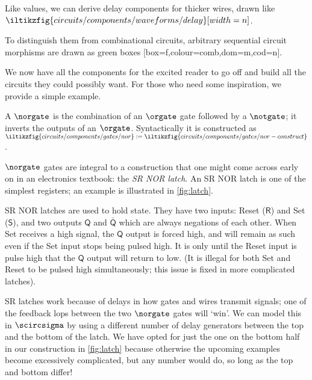 \begin{notation}
    Like values, we can derive delay components for thicker wires, drawn like
    \(
        \iltikzfig{circuits/components/waveforms/delay}[width=n]
    \).
\end{notation}

To distinguish them from combinational circuits, arbitrary sequential circuit
morphisms are drawn as green boxes [box=f,colour=comb,dom=m,cod=n].

We now have all the components for the excited reader to go off and build
all the circuits they could possibly want.
For those who need some inspiration, we provide a simple example.

\begin{example}[SR latch]\label{ex:sr-latch}
    A \(\norgate\) is the combination of an \(\orgate\) gate followed by a
    \(\notgate\); it inverts the outputs of an \(\orgate\).
    Syntactically it is constructed as \(
        \iltikzfig{circuits/components/gates/nor}
        :=
        \iltikzfig{circuits/components/gates/nor-construct}
    \).

    \(\norgate\) gates are integral to a construction that one might come across
    early on in an electronics textbook: the \emph{SR NOR latch}.
    An SR NOR latch is one of the simplest registers; an example is illustrated
    in \cref{fig:latch}.

    SR NOR latches are used to hold state.
    They have two inputs: Reset (\(\mathsf{R}\)) and Set (\(\mathsf{S}\)), and
    two outputs \(\mathsf{Q}\) and \(\bar{\mathsf{Q}}\) which are always
    negations of each other.
    When Set receives a high signal, the \(\mathsf{Q}\) output is forced high,
    and will remain as such even if the Set input stops being pulsed high.
    It is only until the Reset input is pulse high that the \(\mathsf{Q}\)
    output will return to low.
    (It is illegal for both Set and Reset to be pulsed high simultaneously; this
    issue is fixed in more complicated latches).

    SR latches work because of delays in how gates and wires transmit signals;
    one of the feedback lops between the two \(\norgate\) gates will `win'.
    We can model this in \(\scircsigma\) by using a different number of delay
    generators between the top and the bottom of the latch.
    We have opted for just the one on the bottom half in our construction in
    \cref{fig:latch}
    because otherwise the upcoming examples become excessively complicated, but
    any number would do, so long as the top and bottom differ!
\end{example}

